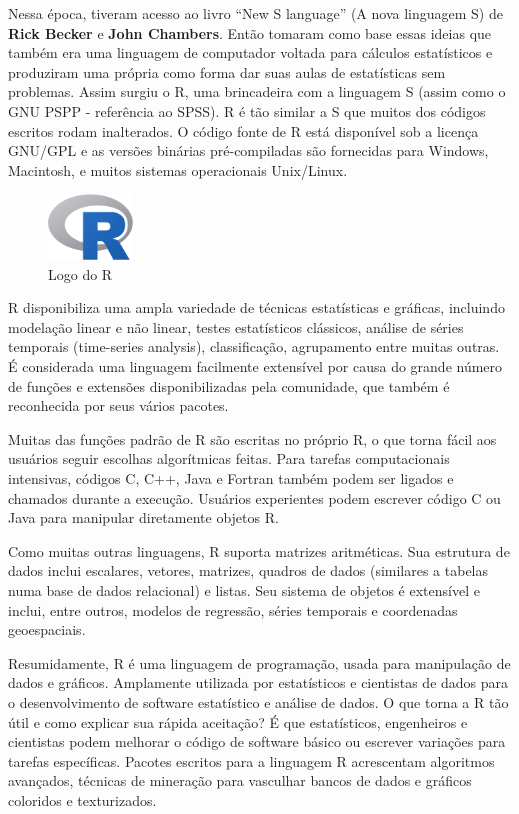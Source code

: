 \documentclass[a4paper,11pt]{article}
\begin{document}
Nessa época, tiveram acesso ao livro ``New S language'' (A nova linguagem S) de \textbf{Rick Becker} e \textbf{John Chambers}. Então tomaram como base essas ideias que também era uma linguagem de computador voltada para cálculos estatísticos e produziram uma própria como forma dar suas aulas de estatísticas sem problemas. Assim surgiu o R, uma brincadeira com a linguagem S (assim como o GNU PSPP - referência ao SPSS). R é tão similar a S que muitos dos códigos escritos rodam inalterados. O código fonte de R está disponível sob a licença GNU/GPL e as versões binárias pré-compiladas são fornecidas para Windows, Macintosh, e muitos sistemas operacionais Unix/Linux.
\begin{figure}[H]
	\centering
	\includegraphics[width=0.2\textwidth]{imagens/logo.png}
	\caption{Logo do R}
\end{figure}

R disponibiliza uma ampla variedade de técnicas estatísticas e gráficas, incluindo modelação linear e não linear, testes estatísticos clássicos, análise de séries temporais (time-series analysis), classificação, agrupamento entre muitas outras. É considerada uma linguagem facilmente extensível por causa do grande número de funções e extensões disponibilizadas pela comunidade, que também é reconhecida por seus vários pacotes.

Muitas das funções padrão de R são escritas no próprio R, o que torna fácil aos usuários seguir escolhas algorítmicas feitas. Para tarefas computacionais intensivas, códigos C, C++, Java e Fortran também podem ser ligados e chamados durante a execução. Usuários experientes podem escrever código C ou Java para manipular diretamente objetos R.

Como muitas outras linguagens, R suporta matrizes aritméticas. Sua estrutura de dados inclui escalares, vetores, matrizes, quadros de dados (similares a tabelas numa base de dados relacional) e listas. Seu sistema de objetos é extensível e inclui, entre outros, modelos de regressão, séries temporais e coordenadas geoespaciais.

Resumidamente, R é uma linguagem de programação, usada para manipulação de dados e gráficos. Amplamente utilizada por estatísticos e cientistas de dados para o desenvolvimento de software estatístico e análise de dados. O que torna a R tão útil e como explicar sua rápida aceitação? É que estatísticos, engenheiros e cientistas podem melhorar o código de software básico ou escrever variações para tarefas específicas. Pacotes escritos para a linguagem R acrescentam algoritmos avançados, técnicas de mineração para vasculhar bancos de dados e gráficos coloridos e texturizados. 
\end{document}
